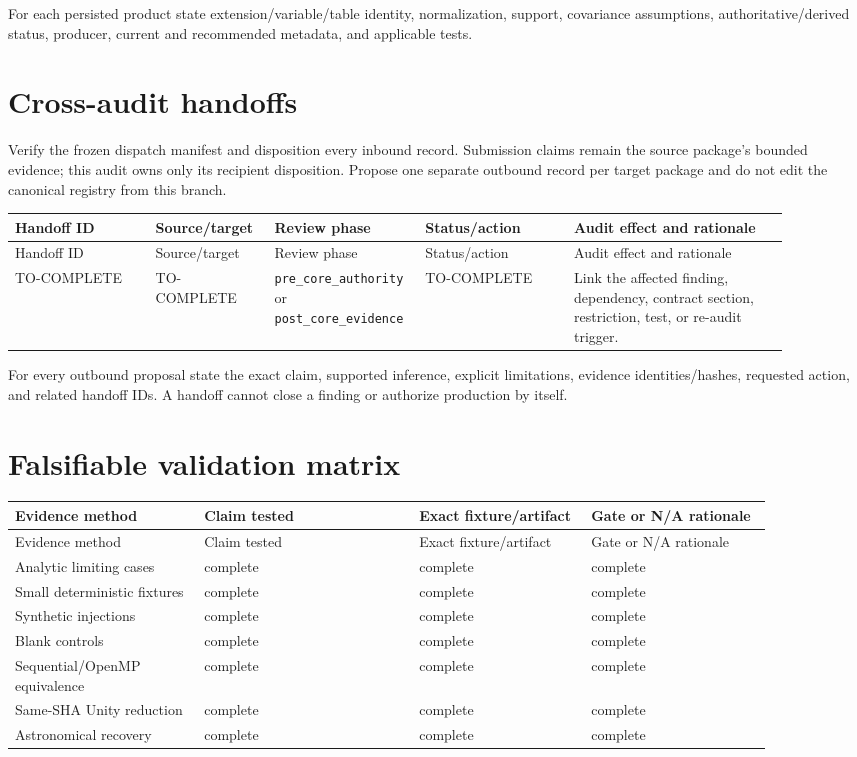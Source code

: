 \documentclass[11pt]{article}
\newcommand{\code}[1]{\nolinkurl{#1}}
\begin{document}
For each persisted product state extension/variable/table identity,
normalization, support, covariance assumptions, authoritative/derived status,
producer, current and recommended metadata, and applicable tests.

\section{Cross-audit handoffs}

Verify the frozen dispatch manifest and disposition every inbound record.
Submission claims remain the source package's bounded evidence; this audit
owns only its recipient disposition. Propose one separate outbound record per
target package and do not edit the canonical registry from this branch.

\begin{longtable}{L{0.17\linewidth}L{0.14\linewidth}L{0.15\linewidth}L{0.18\linewidth}L{0.26\linewidth}}
\toprule
Handoff ID & Source/target & Review phase & Status/action & Audit effect and
rationale\\
\midrule
\endfirsthead
\toprule
Handoff ID & Source/target & Review phase & Status/action & Audit effect and
rationale\\
\midrule
\endhead
TO-COMPLETE & TO-COMPLETE & \code{pre_core_authority} or
\code{post_core_evidence} & TO-COMPLETE & Link the affected finding,
dependency, contract section, restriction, test, or re-audit trigger.\\
\bottomrule
\end{longtable}

For every outbound proposal state the exact claim, supported inference,
explicit limitations, evidence identities/hashes, requested action, and
related handoff IDs. A handoff cannot close a finding or authorize production
by itself.

\section{Falsifiable validation matrix}

\begin{longtable}{L{0.22\linewidth}L{0.25\linewidth}L{0.20\linewidth}L{0.21\linewidth}}
\toprule
Evidence method & Claim tested & Exact fixture/artifact & Gate or N/A rationale\\
\midrule
\endfirsthead
\toprule
Evidence method & Claim tested & Exact fixture/artifact & Gate or N/A rationale\\
\midrule
\endhead
Analytic limiting cases & complete & complete & complete\\
Small deterministic fixtures & complete & complete & complete\\
Synthetic injections & complete & complete & complete\\
Blank controls & complete & complete & complete\\
Sequential/OpenMP equivalence & complete & complete & complete\\
Same-SHA Unity reduction & complete & complete & complete\\
Astronomical recovery & complete & complete & complete\\
\bottomrule
\end{longtable}
\end{document}
